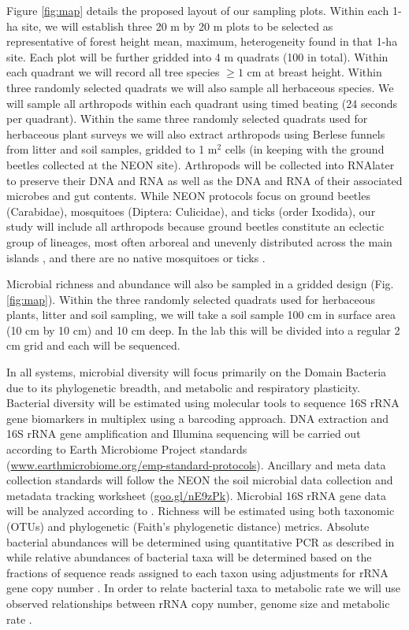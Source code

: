 \documentclass[11pt]{article}
\begin{document}
Figure \ref{fig:map} details the proposed layout of our sampling
plots. Within each 1-ha site, we will establish three 20 m by 20 m
plots to be selected as representative of forest height mean, maximum,
heterogeneity found in that 1-ha site. Each plot will be further
gridded into 4 m quadrats (100 in total).  Within each quadrant we
will record all tree species $\geq 1$ cm at breast height.  Within
three randomly selected quadrats we will also sample all herbaceous
species.  We will sample all arthropods within each quadrant using
timed beating (24 seconds per quadrant).  Within the same three
randomly selected quadrats used for herbaceous plant surveys we will
also extract arthropods using Berlese funnels from litter and soil
samples, gridded to 1 m$^2$ cells (in keeping with the ground beetles
collected at the NEON site).  Arthropods will be collected into
RNAlater to preserve their DNA and RNA as well as the DNA and RNA of
their associated microbes and gut contents.  While NEON protocols
focus on ground beetles (Carabidae), mosquitoes (Diptera: Culicidae),
and ticks (order Ixodida), our study will include all arthropods
because ground beetles constitute an eclectic group of lineages, most
often arboreal and unevenly distributed across the main islands
\citep{Liebherr2000}, and there are no native mosquitoes or ticks
\citep{nishida2002}.

Microbial richness and abundance will also be sampled in a gridded
design (Fig. \ref{fig:map}).  Within the three randomly selected
quadrats used for herbaceous plants, litter and soil sampling, we will
take a soil sample 100 cm in surface area (10 cm by 10 cm) and 10 cm
deep.  In the lab this will be divided into a regular 2 cm grid and
each will be sequenced.  

In all systems, microbial diversity will focus primarily on the Domain
Bacteria due to its phylogenetic breadth, and metabolic and
respiratory plasticity. Bacterial diversity will be estimated using
molecular tools to sequence 16S rRNA gene biomarkers in multiplex
using a barcoding approach. DNA extraction and 16S rRNA gene
amplification and Illumina sequencing will be carried out according to
Earth Microbiome Project standards
(\url{www.earthmicrobiome.org/emp-standard-protocols}). Ancillary
and meta data collection standards will follow the NEON the soil
microbial data collection and metadata tracking worksheet
(\url{goo.gl/nE9zPk}).  Microbial 16S rRNA gene data will be
analyzed according to \citet{shi2015}. Richness will be estimated
using both taxonomic (OTUs) and phylogenetic (Faith's phylogenetic
distance) metrics. Absolute bacterial abundances will be determined
using quantitative PCR as described in \citep{shi2015} while relative
abundances of bacterial taxa will be determined based on the fractions
of sequence reads assigned to each taxon using adjustments for rRNA
gene copy number \citep{kembel2012}.  In order to relate bacterial
taxa to metabolic rate we will use observed relationships between rRNA
copy number, genome size and metabolic rate \citep{delong2010}.
\end{document}
